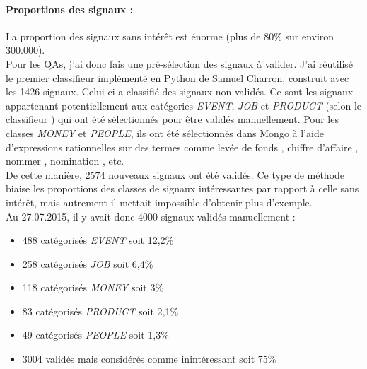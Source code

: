                 \paragraph{Proportions des signaux :}
                La proportion des signaux sans intérêt est énorme (plus de 80\% sur environ 300.000).\\
                Pour les QAs, j'ai donc fais une pré-sélection des signaux à valider. J'ai réutilisé le premier classifieur implémenté en Python de Samuel Charron, construit avec les 1426 signaux. Celui-ci a classifié des signaux non validés. Ce sont les signaux appartenant potentiellement aux catégories \textit{EVENT}, \textit{JOB} et \textit{PRODUCT} (\og selon le classifieur \fg) qui ont été sélectionnés pour être validés manuellement. Pour les classes \textit{MONEY} et \textit{PEOPLE}, ils ont été sélectionnés dans Mongo à l'aide d'expressions rationnelles sur des termes comme \og levée de fonds \fg, \og chiffre d'affaire \fg, \og nommer \fg, \og nomination \fg, etc.\\

                De cette manière, 2574 nouveaux signaux ont été validés. Ce type de méthode biaise les proportions des classes de signaux intéressantes par rapport à celle sans intérêt, mais autrement il mettait impossible d'obtenir plus d'exemple.\\

                Au 27.07.2015, il y avait donc 4000 signaux validés manuellement :
                \begin{itemize}
                    \item 488 catégorisés \textit{EVENT} soit 12,2\%
                    \item 258 catégorisés \textit{JOB} soit 6,4\%
                    \item 118 catégorisés \textit{MONEY} soit 3\%
                    \item 83 catégorisés \textit{PRODUCT} soit 2,1\%
                    \item 49 catégorisés \textit{PEOPLE} soit 1,3\%
                    \item 3004 validés mais considérés comme inintéressant soit 75\%
                \end{itemize}

